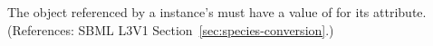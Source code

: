 The \Parameter object referenced by a \Species instance's
 must have a value of  for its
 attribute.  (References: SBML L3V1
Section~\ref{sec:species-conversion}.)
